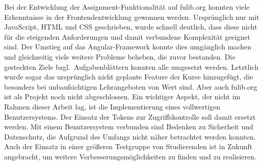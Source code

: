 Bei der Entwicklung der Assignment-Funktionalität auf fulib.org konnten viele Erkenntnisse in der Frontendentwicklung gewonnen werden.
Ursprünglich nur mit JavaScript, HTML und CSS geschrieben, wurde schnell deutlich, dass diese nicht für die steigenden Anforderungen und damit verbundene Komplexität geeignet sind.
Der Umstieg auf das Angular-Framework konnte dies umgänglich machen und gleichzeitig viele weitere Probleme beheben, die zuvor bestanden.
Die gesteckten Ziele bzgl.\ Aufgabenblättern konnten alle umgesetzt werden.
Letztlich wurde sogar das ursprünglich nicht geplante Feature der Kurse hinzugefügt, die besonders bei unbaufsichtigen Lehrangeboten von Wert sind.
Aber auch fulib.org ist als Projekt noch nicht abgeschlossen.
Ein wichtiger Aspekt, der nicht im Rahmen dieser Arbeit lag, ist die Implementierung eines vollwertigen Benutzersystems.
Der Einsatz der Tokens zur Zugriffskontrolle soll damit ersetzt werden.
Mit einem Benutzersystem verbunden sind Bedenken zu Sicherheit und Datenschutz, die Aufgrund des Umfangs nicht näher betrachtet werden konnten.
Auch der Einsatz in einer größeren Testgruppe von Studierenden ist in Zukunft angebracht, um weitere Verbesserungsmöglichkeiten zu finden und zu realisieren.
